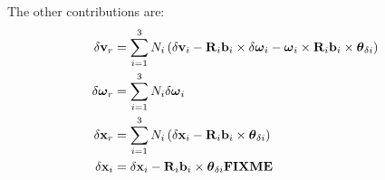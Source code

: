 The other contributions are:
\begin{align}
	\delta\bm{\mathbf{v}}_r &= \sum_{i=1}^3N_i\left( \delta\bm{\mathbf{v}}_i 
			- \bm{\mathbf{R}}_i\bm{\mathbf{b}}_i\times\delta\bm{\mathbf{\omega}}_i
			- \bm{\mathbf{\omega}}_i\times\bm{\mathbf{R}}_i\bm{\mathbf{b}}_i
			\times\bm{\mathbf{\theta}}_{\delta i} \right)\\
	\delta\bm{\mathbf{\omega}}_r &= \sum_{i=1}^3N_i\delta\bm{\mathbf{\omega}}_i\\ 
	\delta\bm{\mathbf{x}}_r &= \sum_{i=1}^3N_i\left( \delta\bm{\mathbf{x}}_i 
			- \bm{\mathbf{R}}_i\bm{\mathbf{b}}_i\times\bm{\mathbf{\theta}}_{\delta i} \right)\\
	\delta\bm{\mathbf{x}}_i &= \delta\bm{\mathbf{x}}_i - \bm{\mathbf{R}}_i\bm{\mathbf{b}}_i
			\times\bm{\mathbf{\theta}}_{\delta i}
	\textbf{FIXME}
\end{align}


